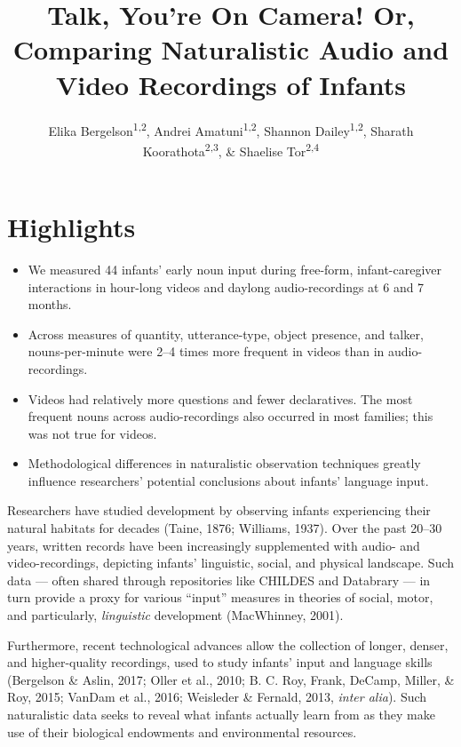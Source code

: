 \documentclass[man]{apa6}
\title{Talk, You're On Camera! Or, Comparing Naturalistic Audio and Video
Recordings of Infants}
\author{Elika Bergelson\textsuperscript{1,2}, Andrei Amatuni\textsuperscript{1,2}, Shannon Dailey\textsuperscript{1,2}, Sharath Koorathota\textsuperscript{2,3}, \& Shaelise Tor\textsuperscript{2,4}}
\affiliation{
    \vspace{0.5cm}
          \textsuperscript{1} Duke University\\
          \textsuperscript{2} University of Rochester\\
          \textsuperscript{3} Columbia University Medical Center\\
          \textsuperscript{4} Syracuse University  }
\providecommand{\tightlist}{%
  \setlength{\itemsep}{0pt}\setlength{\parskip}{0pt}}
\theoremstyle{definition}
\theoremstyle{definition}
\theoremstyle{definition}
\theoremstyle{remark}
\begin{document}
\maketitle

\setcounter{secnumdepth}{0}



\section{Highlights}\label{highlights}

\begin{itemize}
\tightlist
\item
  We measured 44 infants' early noun input during free-form,
  infant-caregiver interactions in hour-long videos and daylong
  audio-recordings at 6 and 7 months.
\item
  Across measures of quantity, utterance-type, object presence, and
  talker, nouns-per-minute were 2--4 times more frequent in videos than
  in audio-recordings.
\item
  Videos had relatively more questions and fewer declaratives. The most
  frequent nouns across audio-recordings also occurred in most families;
  this was not true for videos.
\item
  Methodological differences in naturalistic observation techniques
  greatly influence researchers' potential conclusions about infants'
  language input.
\end{itemize}

Researchers have studied development by observing infants experiencing
their natural habitats for decades (Taine, 1876; Williams, 1937). Over
the past 20--30 years, written records have been increasingly
supplemented with audio- and video-recordings, depicting infants'
linguistic, social, and physical landscape. Such data --- often shared
through repositories like CHILDES and Databrary --- in turn provide a
proxy for various \enquote{input} measures in theories of social, motor,
and particularly, \emph{linguistic} development (MacWhinney, 2001).

Furthermore, recent technological advances allow the collection of
longer, denser, and higher-quality recordings, used to study infants'
input and language skills (Bergelson \& Aslin, 2017; Oller et al., 2010;
B. C. Roy, Frank, DeCamp, Miller, \& Roy, 2015; VanDam et al., 2016;
Weisleder \& Fernald, 2013, \emph{inter alia}). Such naturalistic data
seeks to reveal what infants actually learn from as they make use of
their biological endowments and environmental resources.
\end{document}
